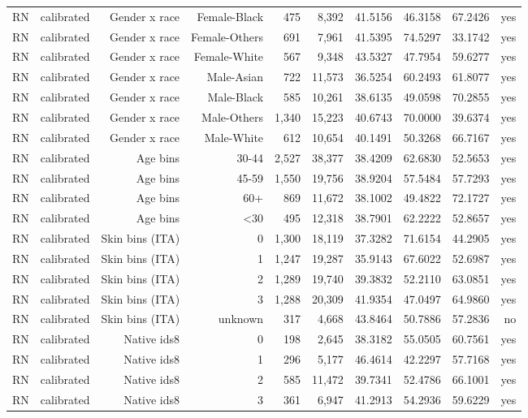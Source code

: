 \documentclass[10pt]{article}
\begin{document}
\begin{longtable}{@{}lrrrrrrrrr@{}}
RN & calibrated & Gender x race & Female-Black & 475 & 8,392 & 41.5156 & 46.3158 & 67.2426 & yes \\
RN & calibrated & Gender x race & Female-Others & 691 & 7,961 & 41.5395 & 74.5297 & 33.1742 & yes \\
RN & calibrated & Gender x race & Female-White & 567 & 9,348 & 43.5327 & 47.7954 & 59.6277 & yes \\
RN & calibrated & Gender x race & Male-Asian & 722 & 11,573 & 36.5254 & 60.2493 & 61.8077 & yes \\
RN & calibrated & Gender x race & Male-Black & 585 & 10,261 & 38.6135 & 49.0598 & 70.2855 & yes \\
RN & calibrated & Gender x race & Male-Others & 1,340 & 15,223 & 40.6743 & 70.0000 & 39.6374 & yes \\
RN & calibrated & Gender x race & Male-White & 612 & 10,654 & 40.1491 & 50.3268 & 66.7167 & yes \\
RN & calibrated & Age bins & 30-44 & 2,527 & 38,377 & 38.4209 & 62.6830 & 52.5653 & yes \\
RN & calibrated & Age bins & 45-59 & 1,550 & 19,756 & 38.9204 & 57.5484 & 57.7293 & yes \\
RN & calibrated & Age bins & 60+ & 869 & 11,672 & 38.1002 & 49.4822 & 72.1727 & yes \\
RN & calibrated & Age bins & \textless{}30 & 495 & 12,318 & 38.7901 & 62.2222 & 52.8657 & yes \\
RN & calibrated & Skin bins (ITA) & 0 & 1,300 & 18,119 & 37.3282 & 71.6154 & 44.2905 & yes \\
RN & calibrated & Skin bins (ITA) & 1 & 1,247 & 19,287 & 35.9143 & 67.6022 & 52.6987 & yes \\
RN & calibrated & Skin bins (ITA) & 2 & 1,289 & 19,740 & 39.3832 & 52.2110 & 63.0851 & yes \\
RN & calibrated & Skin bins (ITA) & 3 & 1,288 & 20,309 & 41.9354 & 47.0497 & 64.9860 & yes \\
RN & calibrated & Skin bins (ITA) & unknown & 317 & 4,668 & 43.8464 & 50.7886 & 57.2836 & no \\
RN & calibrated & Native ids8 & 0 & 198 & 2,645 & 38.3182 & 55.0505 & 60.7561 & yes \\
RN & calibrated & Native ids8 & 1 & 296 & 5,177 & 46.4614 & 42.2297 & 57.7168 & yes \\
RN & calibrated & Native ids8 & 2 & 585 & 11,472 & 39.7341 & 52.4786 & 66.1001 & yes \\
RN & calibrated & Native ids8 & 3 & 361 & 6,947 & 41.2913 & 54.2936 & 59.6229 & yes \\

\end{longtable}
\end{document}
